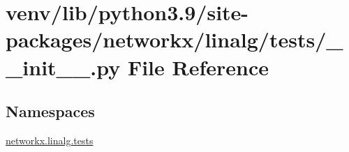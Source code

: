 \hypertarget{venv_2lib_2python3_89_2site-packages_2networkx_2linalg_2tests_2____init_____8py}{}\section{venv/lib/python3.9/site-\/packages/networkx/linalg/tests/\+\_\+\+\_\+init\+\_\+\+\_\+.py File Reference}
\label{venv_2lib_2python3_89_2site-packages_2networkx_2linalg_2tests_2____init_____8py}
\subsection*{Namespaces}
\begin{DoxyCompactItemize}
\item 
 \hyperlink{namespacenetworkx_1_1linalg_1_1tests}{networkx.\+linalg.\+tests}
\end{DoxyCompactItemize}
